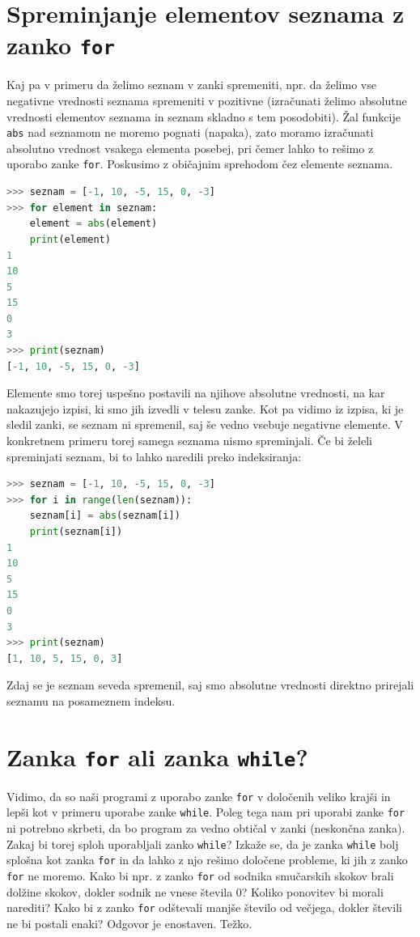 \section{Spreminjanje elementov seznama z zanko \texttt{for}}
Kaj pa v primeru da želimo seznam v zanki spremeniti, npr. da želimo vse negativne vrednosti seznama spremeniti v pozitivne (izračunati želimo absolutne vrednosti elementov seznama in seznam skladno s tem posodobiti). Žal funkcije \texttt{abs} nad seznamom ne moremo pognati (napaka), zato moramo izračunati absolutno vrednost vsakega elementa posebej, pri čemer lahko to rešimo z uporabo zanke \texttt{for}. Poskusimo z običajnim sprehodom čez elemente seznama.
\begin{lstlisting}[language=Python]
>>> seznam = [-1, 10, -5, 15, 0, -3]
>>> for element in seznam:
	element = abs(element)
	print(element)
1
10
5
15
0
3
>>> print(seznam)
[-1, 10, -5, 15, 0, -3]
\end{lstlisting}
Elemente smo torej uspešno postavili na njihove absolutne vrednosti, na kar nakazujejo izpisi, ki smo jih izvedli v telesu zanke. Kot pa vidimo iz izpisa, ki je sledil zanki, se seznam ni spremenil, saj še vedno vsebuje negativne elemente. V konkretnem primeru torej samega seznama nismo spreminjali. Če bi želeli spreminjati seznam, bi to lahko naredili preko indeksiranja:
\begin{lstlisting}[language=Python]
>>> seznam = [-1, 10, -5, 15, 0, -3]
>>> for i in range(len(seznam)):
	seznam[i] = abs(seznam[i])
	print(seznam[i])
1
10
5
15
0
3
>>> print(seznam)
[1, 10, 5, 15, 0, 3]
\end{lstlisting}
Zdaj se je seznam seveda spremenil, saj smo absolutne vrednosti direktno prirejali seznamu na posameznem indeksu.

\section{Zanka \texttt{for} ali zanka \texttt{while}?}
Vidimo, da so naši programi z uporabo zanke \texttt{for} v določenih veliko krajši in lepši kot v primeru uporabe zanke \texttt{while}. Poleg tega nam pri uporabi zanke \texttt{for} ni potrebno skrbeti, da bo program za vedno obtičal v zanki (neskončna zanka). Zakaj bi torej sploh uporabljali zanko \texttt{while}? Izkaže se, da je zanka \texttt{while} bolj splošna kot zanka \texttt{for} in da lahko z njo rešimo določene probleme, ki jih z zanko \texttt{for} ne moremo. Kako bi npr. z zanko \texttt{for} od sodnika smučarskih skokov brali dolžine skokov, dokler sodnik ne vnese števila 0? Koliko ponovitev bi morali narediti? Kako bi z zanko \texttt{for} odštevali manjše število od večjega, dokler števili ne bi postali enaki? Odgovor je enostaven. Težko.

